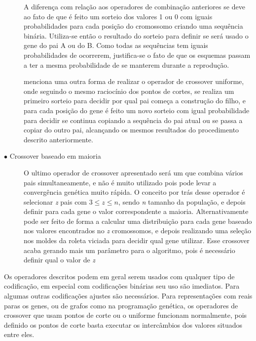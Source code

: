 \begin{description}
A diferença com relação aos operadores de combinação anteriores se deve ao fato de que é feito um sorteio dos valores 1 ou 0 com iguais probabilidades para cada posição do cromossomo criando uma sequência binária. Utiliza-se então o resultado do sorteio para definir se será usado o gene do pai A ou do B. Como todas as sequências tem iguais probabilidades de ocorrerem, justifica-se o fato de que os esquemas passam a ter a mesma probabilidade de se manterem durante a reprodução.

\citeauthor{Mitchell1996} menciona uma outra forma de realizar o operador de crossover uniforme, onde seguindo o mesmo raciocínio dos pontos de cortes, se realiza um primeiro sorteio para decidir por qual pai começa a construção do filho, e para cada posição do gene é feito um novo sorteio com igual probabilidade para decidir se continua copiando a sequência do pai atual ou se passa a copiar do outro pai, alcançando os mesmos resultados do procedimento descrito anteriormente.

\item[$\bullet$ Crossover baseado em maioria] \text{}

O ultimo operador de crossover apresentado será um que combina vários pais simultaneamente, e não é muito utilizado pois pode levar a convergência genética muito rápida. O conceito por trás desse operador é selecionar \textit{z} pais com \(3 \le z \le n\), sendo \textit{n} tamanho da população, e depois definir para cada gene o valor correspondente a maioria. Alternativamente pode ser feito de forma a calcular uma distribuição para cada gene baseado nos valores encontrados no \textit{z} cromossomos, e depois realizando uma seleção nos moldes da roleta viciada para decidir qual gene utilizar. Esse crossover acaba gerando mais um parâmetro para o algoritmo, pois é necessário definir qual o valor de \textit{z}
 
\end{description}

Os operadores descritos podem em geral serem usados com qualquer tipo de codificação, em especial com codificações binárias seu uso são imediatos. Para algumas outras codificações ajustes são necessários. Para representações com reais paras os genes, ou de grafos como na programação genética, os operadores de crossover que usam pontos de corte ou o uniforme funcionam normalmente, pois definido os pontos de corte basta executar os intercâmbios dos valores situados entre eles. 

